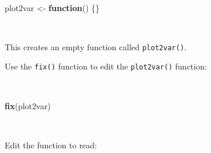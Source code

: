 \documentclass[12pt,a4paper]{book}
\newenvironment{Shaded}{\begin{snugshade}}{\end{snugshade}}
\newcommand{\ControlFlowTok}[1]{\textcolor[rgb]{0.13,0.29,0.53}{\textbf{#1}}}
\newcommand{\KeywordTok}[1]{\textcolor[rgb]{0.13,0.29,0.53}{\textbf{#1}}}
\newcommand{\NormalTok}[1]{#1}
\newcommand{\StringTok}[1]{\textcolor[rgb]{0.31,0.60,0.02}{#1}}
\theoremstyle{definition}
\theoremstyle{definition}
\theoremstyle{definition}
\theoremstyle{remark}
\begin{document}
~

\begin{Shaded}
\begin{Highlighting}[]
\NormalTok{plot2var <-}\StringTok{ }\ControlFlowTok{function}\NormalTok{() \{\}}
\end{Highlighting}
\end{Shaded}

~

This creates an empty function called \texttt{plot2var()}.

Use the \texttt{fix()} function to edit the \texttt{plot2var()}
function:

~

\begin{Shaded}
\begin{Highlighting}[]
\KeywordTok{fix}\NormalTok{(plot2var)}
\end{Highlighting}
\end{Shaded}

~

Edit the function to read:

~
\end{document}
